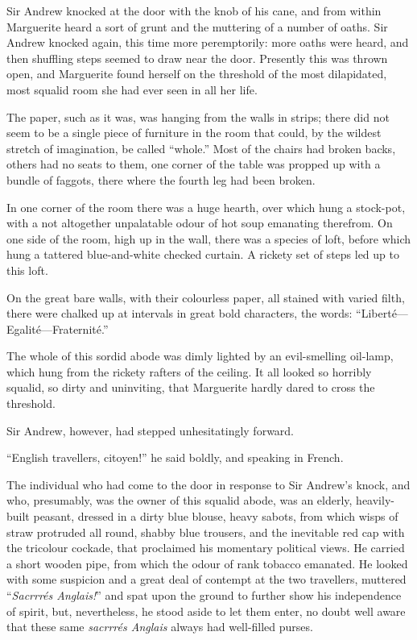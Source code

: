 \documentclass[paper=5.5in:8.5in,BCOR=7mm,twoside,DIV=calc,12pt,usegeometry,chapterprefix,endperiod,headings=big]{scrbook}
\begin{document}
Sir Andrew knocked at the door with the knob of his cane, and from within Marguerite heard a sort of grunt and the muttering of a number of oaths. Sir Andrew knocked again, this time more peremptorily: more oaths were heard, and then shuffling steps seemed to draw near the door. Presently this was thrown open, and Marguerite found herself on the threshold of the most dilapidated, most squalid room she had ever seen in all her life.

The paper, such as it was, was hanging from the walls in strips; there did not seem to be a single piece of furniture in the room that could, by the wildest stretch of imagination, be called \enquote{whole.} Most of the chairs had broken backs, others had no seats to them, one corner of the table was propped up with a bundle of faggots, there where the fourth leg had been broken.

In one corner of the room there was a huge hearth, over which hung a stock-pot, with a not altogether unpalatable odour of hot soup emanating therefrom. On one side of the room, high up in the wall, there was a species of loft, before which hung a tattered blue-and-white checked curtain. A rickety set of steps led up to this loft.

On the great bare walls, with their colourless paper, all stained with varied filth, there were chalked up at intervals in great bold characters, the words: \enquote{Liberté---Egalité---Fraternité.}

The whole of this sordid abode was dimly lighted by an evil-smelling oil-lamp, which hung from the rickety rafters of the ceiling. It all looked so horribly squalid, so dirty and uninviting, that Marguerite hardly dared to cross the threshold.

Sir Andrew, however, had stepped unhesitatingly forward.

\enquote{English travellers, citoyen!} he said boldly, and speaking in French.

The individual who had come to the door in response to Sir Andrew's knock, and who, presumably, was the owner of this squalid abode, was an elderly, heavily-built peasant, dressed in a dirty blue blouse, heavy sabots, from which wisps of straw protruded all round, shabby blue trousers, and the inevitable red cap with the tricolour cockade, that proclaimed his momentary political views. He carried a short wooden pipe, from which the odour of rank tobacco emanated. He looked with some suspicion and a great deal of contempt at the two travellers, muttered \enquote{\textit{Sacrrrés Anglais!}} and spat upon the ground to further show his independence of spirit, but, nevertheless, he stood aside to let them enter, no doubt well aware that these same \textit{sacrrrés Anglais} always had well-filled purses.
\end{document}
